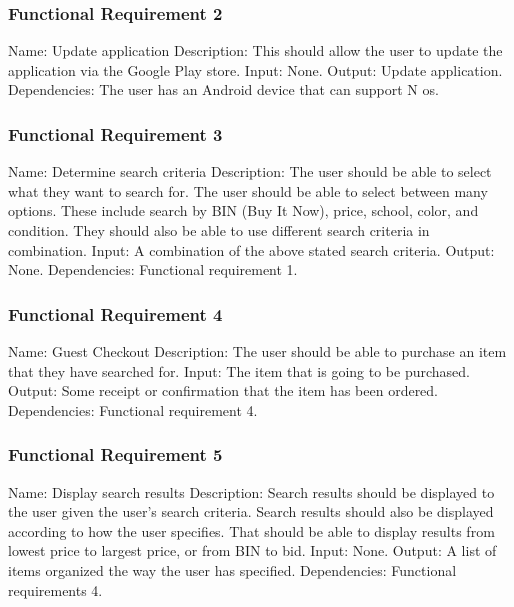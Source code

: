 \documentclass[journal,compsoc, 10pt, draftclsnofoot, onecolumn]{IEEEtran}
\begin{document}
\subsubsection*{Functional Requirement 2}
Name: Update application\newline
Description: This should allow the user to update the application via the Google
 Play store.\newline
Input: None.\newline
Output: Update application.\newline
Dependencies: The user has an Android device that can support N os.

\subsubsection*{Functional Requirement 3}
Name: Determine search criteria\newline
Description: The user should be able to select what they want to search for. The
 user should be able to select between many options. These include search by BIN
 (Buy It Now), price, school, color, and condition. They should also be
 able to use different search criteria in combination.\newline
Input: A combination of the above stated search criteria.\newline
Output: None.\newline
Dependencies: Functional requirement 1.

\subsubsection*{Functional Requirement 4}
Name: Guest Checkout\newline
Description: The user should be able to purchase an item that they have searched
 for.\newline
Input: The item that is going to be purchased.\newline
Output: Some receipt or confirmation that the item has been ordered.\newline
Dependencies: Functional requirement 4.

\subsubsection*{Functional Requirement 5}
Name: Display search results\newline
Description: Search results should be displayed to the user given the user's 
search criteria. Search results should also be displayed according to how the 
user specifies. That should be able to display results from lowest price to 
largest price, or from BIN to bid.\newline
Input: None.\newline
Output: A list of items organized the way the user has specified.\newline
Dependencies: Functional requirements 4.
\end{document}
